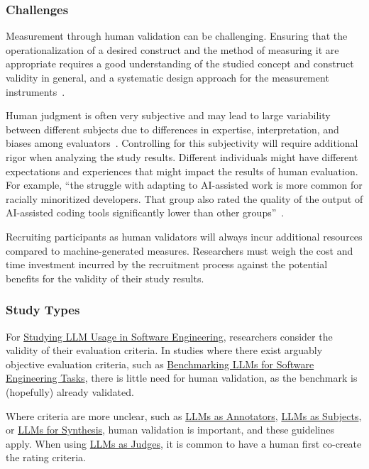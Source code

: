 \subsubsection{Challenges}

Measurement through human validation can be challenging.
Ensuring that the operationalization of a desired construct and the method of measuring it are appropriate requires a good understanding of the studied concept and construct validity in general, and a systematic design approach for the measurement instruments~\cite{DBLP:journals/tse/SjobergB23}.

Human judgment is often very subjective and may lead to large variability between different subjects due to differences in expertise, interpretation, and biases among evaluators~\cite{DBLP:journals/pacmhci/McDonaldSF19}.
Controlling for this subjectivity will require additional rigor when analyzing the study results.
Different individuals might have different expectations and experiences that might impact the results of human evaluation. For example, \enquote{the struggle with adapting to AI-assisted work is more common for racially minoritized developers. That group also rated the quality of the output of AI-assisted coding tools significantly lower than other groups}~\cite{hicks_lee_foster-marks_2025}.

Recruiting participants as human validators will always incur additional resources compared to machine-generated measures.
Researchers must weigh the cost and time investment incurred by the recruitment process against the potential benefits for the validity of their study results.

\subsubsection{Study Types}

For \href{/study-types/#studying-llm-usage-in-software-engineering}{Studying LLM Usage in Software Engineering}, researchers \should consider the validity of their evaluation criteria.
In studies where there exist arguably objective evaluation criteria, such as \href{/study-types/#benchmarking-llms-for-software-engineering-tasks}{Benchmarking LLMs for Software Engineering Tasks}, there is little need for human validation, as the benchmark is (hopefully) already validated.

Where criteria are more unclear, such as \href{/study-types/#llms-as-annotators}{LLMs as Annotators}, \href{/study-types/#llms-as-subjects}{LLMs as Subjects}, or \href{/study-types/#llms-for-synthesis}{LLMs for Synthesis}, human validation is important, and these guidelines apply. When using \href{/study-types/#llms-as-judges}{LLMs as Judges}, it is common to have a human first co-create the rating criteria. 

